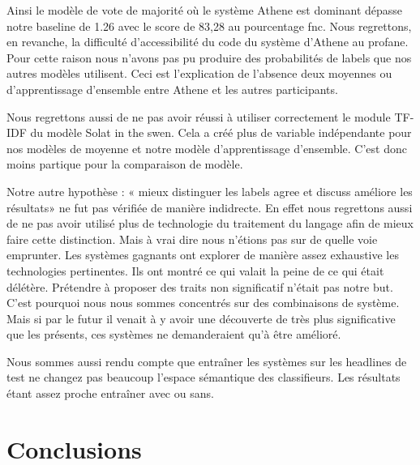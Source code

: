 \documentclass[11pt,a4paper,oldfontcommands]{memoir}
\begin{document}
Ainsi le modèle de vote de majorité où le système Athene est dominant dépasse notre baseline de 1.26 avec le score de 83,28 au pourcentage fnc.
Nous regrettons, en revanche, la difficulté d'accessibilité du code du système d'Athene au profane. Pour cette raison nous n'avons pas pu produire des probabilités de labels que nos autres modèles utilisent. Ceci est l'explication de l'absence deux moyennes ou d'apprentissage d'ensemble entre Athene et les autres participants.

Nous regrettons aussi de ne pas avoir réussi à utiliser correctement le module TF-IDF du modèle Solat in the swen.
Cela a créé plus de variable indépendante pour nos modèles de moyenne et notre modèle d'apprentissage d'ensemble.
C'est donc moins partique pour la comparaison de modèle.

Notre autre hypothèse : « mieux distinguer les labels agree et discuss améliore les résultats» ne fut pas vérifiée de manière indidrecte.
En effet nous regrettons aussi de ne pas avoir utilisé plus de technologie du traitement du langage afin de mieux faire cette distinction.
Mais à vrai dire nous n'étions pas sur de quelle voie emprunter. Les systèmes gagnants ont explorer de manière assez exhaustive les technologies pertinentes.
Ils ont montré ce qui valait la peine de ce qui était délétère.
Prétendre à proposer des traits non significatif n'était pas notre but.
C'est pourquoi nous nous sommes concentrés sur des combinaisons de système.
Mais si par le futur il venait à y avoir une découverte de très plus significative que les présents, ces systèmes ne demanderaient qu'à être amélioré.

Nous sommes aussi rendu compte que entraîner les systèmes sur les headlines de test ne changez pas beaucoup l'espace sémantique des classifieurs. Les résultats étant assez proche entraîner avec ou sans.

\chapter{Conclusions}
\end{document}
